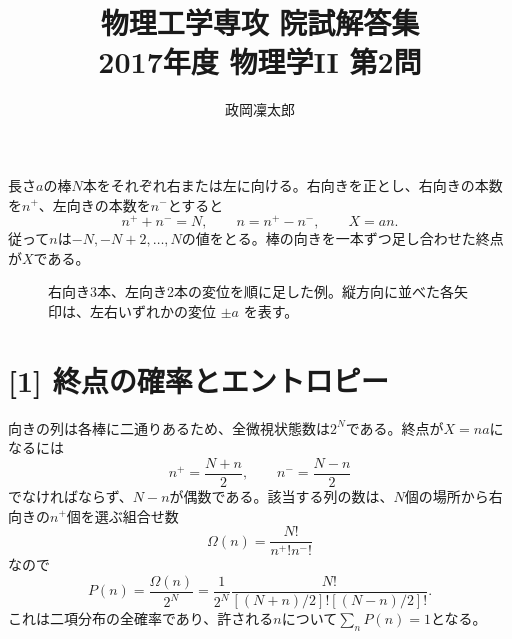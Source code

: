 \documentclass[11pt,a4paper]{article}
\title{物理工学専攻 院試解答集\\2017年度 物理学II 第2問}
\author{政岡凜太郎}
\date{}
\begin{document}
\maketitle

長さ$a$の棒$N$本をそれぞれ右または左に向ける。右向きを正とし、右向きの本数を$n^+$、左向きの本数を$n^-$とすると
\begin{equation}
 n^++n^-=N,\qquad n=n^+-n^-,\qquad X=an.
\end{equation}
従って$n$は$-N,-N+2,\ldots,N$の値をとる。棒の向きを一本ずつ足し合わせた終点が$X$である。
\begin{figure}[htbp]
\centering
{}
\caption{右向き3本、左向き2本の変位を順に足した例。縦方向に並べた各矢印は、左右いずれかの変位 $\pm a$ を表す。}
\end{figure}

\section*{[1] 終点の確率とエントロピー}
向きの列は各棒に二通りあるため、全微視状態数は$2^N$である。終点が$X=na$になるには
\begin{equation}
 n^+=\frac{N+n}{2},\qquad n^-=\frac{N-n}{2}
\end{equation}
でなければならず、$N-n$が偶数である。該当する列の数は、$N$個の場所から右向きの$n^+$個を選ぶ組合せ数
\begin{equation}
 \Omega(n)=\frac{N!}{n^+!n^-!}
\end{equation}
なので
\begin{equation}
 P(n)=\frac{\Omega(n)}{2^N}
 =\frac{1}{2^N}\frac{N!}{[(N+n)/2]![(N-n)/2]!}.
\end{equation}
これは二項分布の全確率であり、許される$n$について$\sum_nP(n)=1$となる。
\end{document}
